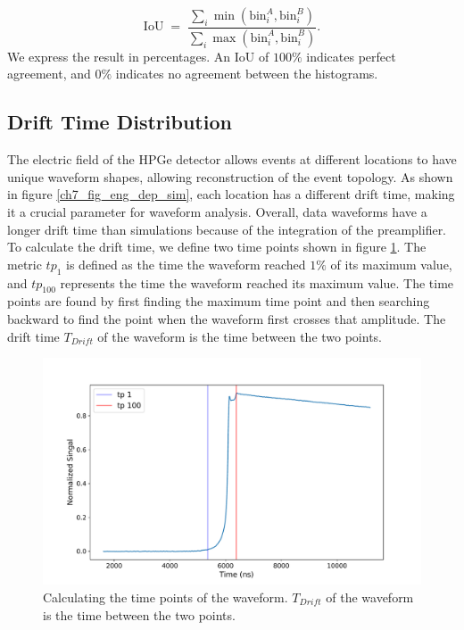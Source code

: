 \begin{equation}
  \text{IoU} \;=\; \frac{\sum_{i} \min(\text{bin}_i^A, \text{bin}_i^B)}{\sum_{i} \max(\text{bin}_i^A, \text{bin}_i^B)}.    
\end{equation}
We express the result in percentages. An IoU of $100\%$ indicates perfect agreement, and $0\%$ indicates no agreement between the histograms.
 
\subsection{Drift Time Distribution}
The electric field of the HPGe detector allows events at different locations to have unique waveform shapes, allowing reconstruction of the event topology. As shown in figure \ref{ch7_fig_eng_dep_sim}, each location has a different drift time, making it a crucial parameter for waveform analysis. Overall, data waveforms have a longer drift time than simulations because of the integration of the preamplifier. To calculate the drift time, we define two time points shown in figure \ref{fig_ch8_time_calc}. The metric $tp_{1}$ is defined as the time the waveform reached $1\%$ of its maximum value, and $tp_{100}$ represents the time the waveform reached its maximum value. The time points are found by first finding the maximum time point and then searching backward to find the point when the waveform first crosses that amplitude. The drift time $T_{Drift}$ of the waveform is the time between the two points. 

\begin{figure}%
    \centering
    \includegraphics[width=0.9\linewidth]{ch8/figs/time_calc.pdf}
    \caption{Calculating the time points of the waveform. $T_{Drift}$ of the waveform is the time between the two points.}
    \label{fig_ch8_time_calc}
\end{figure}

